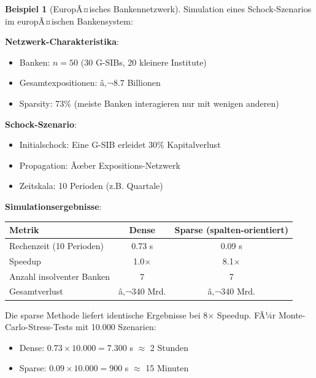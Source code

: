 ﻿\documentclass[a4paper,12pt]{report}
\theoremstyle{definition}
\newtheorem{beispiel}{Beispiel}
\begin{document}
	\begin{beispiel}[EuropÃ¤isches Bankennetzwerk]
		Simulation eines Schock-Szenarios im europÃ¤ischen Bankensystem:
		
		\textbf{Netzwerk-Charakteristika}:
		\begin{itemize}
			\item Banken: $n = 50$ (30 G-SIBs, 20 kleinere Institute)
			\item Gesamtexpositionen: â‚¬8.7 Billionen
			\item Sparsity: 73\% (meiste Banken interagieren nur mit wenigen anderen)
		\end{itemize}
		
		\textbf{Schock-Szenario}:
		\begin{itemize}
			\item Initialschock: Eine G-SIB erleidet 30\% Kapitalverlust
			\item Propagation: Ãœber Expositions-Netzwerk
			\item Zeitskala: 10 Perioden (z.B. Quartale)
		\end{itemize}
		
		\textbf{Simulationsergebnisse}:
		\begin{center}
			\begin{tabular}{|l|c|c|}
				\hline
				\textbf{Metrik} & \textbf{Dense} & \textbf{Sparse (spalten-orientiert)} \\
				\hline
				Rechenzeit (10 Perioden) & 0.73 s & 0.09 s \\
				Speedup & 1.0$\times$ & 8.1$\times$ \\
				Anzahl insolventer Banken & 7 & 7 \\
				Gesamtverlust & â‚¬340 Mrd. & â‚¬340 Mrd. \\
				\hline
			\end{tabular}
		\end{center}
		
		Die sparse Methode liefert identische Ergebnisse bei 8$\times$ Speedup. FÃ¼r Monte-Carlo-Stress-Tests mit 10.000 Szenarien:
		\begin{itemize}
			\item Dense: $0.73 \times 10.000 = 7.300$ s $\approx$ 2 Stunden
			\item Sparse: $0.09 \times 10.000 = 900$ s $\approx$ 15 Minuten
		\end{itemize}
	\end{beispiel}
	
\end{document}
